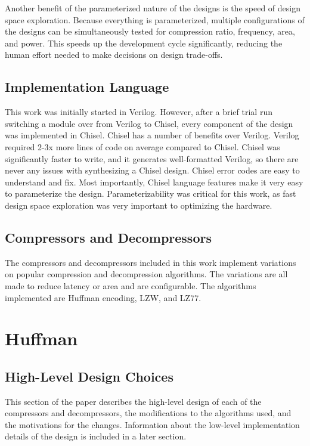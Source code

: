 \documentclass[doublespace,nopageskip]{VTthesis}
\begin{document}
Another benefit of the parameterized nature of the designs is the speed of design space exploration. Because everything is parameterized, multiple configurations of the designs can be simultaneously tested for compression ratio, frequency, area, and power. This speeds up the development cycle significantly, reducing the human effort needed to make decisions on design trade-offs.

\subsection{Implementation Language}\label{ss:implementation_language}
This work was initially started in Verilog. However, after a brief trial run switching a module over from Verilog to Chisel, every component of the design was implemented in Chisel. Chisel has a number of benefits over Verilog. Verilog required 2-3x more lines of code on average compared to Chisel. Chisel was significantly faster to write, and it generates well-formatted Verilog, so there are never any issues with synthesizing a Chisel design. Chisel error codes are easy to understand and fix. Most importantly, Chisel language features make it very easy to parameterize the design. Parameterizability was critical for this work, as fast design space exploration was very important to optimizing the hardware.

\subsection{Compressors and Decompressors}\label{ss:compressors_and_decompressors}
The compressors and decompressors included in this work implement variations on popular compression and decompression algorithms. The variations are all made to reduce latency or area and are configurable. The algorithms implemented are Huffman encoding, LZW, and LZ77.

\section{Huffman}\label{ss:huffman}
\subsection{High-Level Design Choices}\label{se:huffman_design_choices}
This section of the paper describes the high-level design of each of the compressors and decompressors, the modifications to the algorithms used, and the motivations for the changes. Information about the low-level implementation details of the design is included in a later section.
\end{document}
